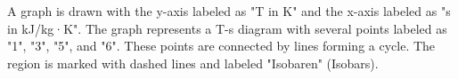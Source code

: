 A graph is drawn with the y-axis labeled as "T in K" and the x-axis labeled as "s in kJ/kg·K". The graph represents a T-s diagram with several points labeled as "1", "3", "5", and "6". These points are connected by lines forming a cycle. The region is marked with dashed lines and labeled "Isobaren" (Isobars).